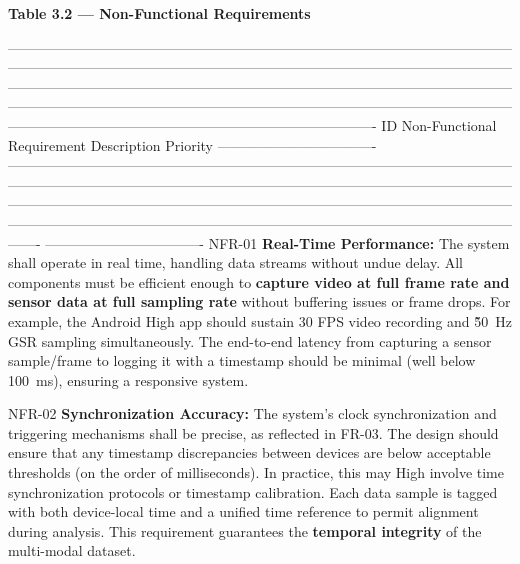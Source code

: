 \textbf{Table 3.2 --- Non-Functional Requirements}

  -------------------------------------------------------------------------------------------------------------------------------------------------------------------------------------------------------------------------------------------------------------------------------------------------------------------------------------------------------------------------------------------------------------------------------------------------------------------------------------------------------------------------------
  ID                      Non-Functional Requirement Description                                                                                                                                                                                                                                                                Priority
  ---------------------------------- ------------------------------------------------------------------------------------------------------------------------------------------------------------------------------------------------------------------------------------------------------------------------------------------------------------------------------------------------------------------------------------------------------------------------------------------------------- ----------------------------------
  NFR-01                  \textbf{Real-Time Performance:} The system shall operate in real time, handling data streams without undue delay. All components must be efficient enough to \textbf{capture video at full frame rate and sensor data at full sampling rate} without buffering issues or frame drops. For example, the Android  High
                          app should sustain 30 FPS video recording and \~50 Hz GSR sampling simultaneously. The end-to-end latency from capturing a sensor sample/frame to logging it with a timestamp should be minimal (well below 100 ms), ensuring a responsive system.                                                    

  NFR-02                  \textbf{Synchronization Accuracy:} The system's clock synchronization and triggering mechanisms shall be precise, as reflected in FR-03. The design should ensure that any timestamp discrepancies between devices are below acceptable thresholds (on the order of milliseconds). In practice, this may   High
                          involve time synchronization protocols or timestamp calibration. Each data sample is tagged with both device-local time and a unified time reference to permit alignment during                                                                                                                       
                          analysis\cite{CortisolStressIndicator2020}. This requirement guarantees the \textbf{temporal integrity} of the multi-modal dataset.                                                                       


